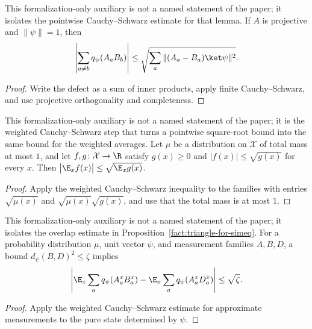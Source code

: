 \begin{lemma}
	\label{lem:distance-projective-left-square-root}
	\leanok
	This formalization-only auxiliary is not a named statement of the paper; it
	isolates the pointwise Cauchy--Schwarz estimate for that lemma. If $A$ is
	projective and $\|\psi\|=1$, then
	\[
		\left|\sum_{a\ne b}q_\psi(A_aB_b)\right|
		\leq\sqrt{\sum_a\|(A_a-B_a)\ket\psi\|^2}.
	\]
\end{lemma}
\begin{proof}
	\leanok
	Write the defect as a sum of inner products, apply finite
	Cauchy--Schwarz, and use projective orthogonality and completeness.
\end{proof}

\begin{lemma}
	\label{lem:distance-averaged-square-root}
	\leanok
	This formalization-only auxiliary is not a named statement of the paper; it
	is the weighted Cauchy--Schwarz step that turns a pointwise square-root
	bound into the same bound for the weighted averages. Let $\mu$ be a
	distribution on $\mathcal X$ of total mass at most $1$, and let
	$f,g\colon\mathcal X\to\R$ satisfy $g(x)\geq0$ and
	$|f(x)|\leq\sqrt{g(x)}$ for every $x$. Then
	$\bigl|\E_x f(x)\bigr|\leq\sqrt{\E_x g(x)}$.
\end{lemma}
\begin{proof}
	\leanok
	Apply the weighted Cauchy--Schwarz inequality to the families with entries
	$\sqrt{\mu(x)}$ and $\sqrt{\mu(x)}\sqrt{g(x)}$, and use that the total mass
	is at most $1$.
\end{proof}

\begin{lemma}
	\label{lem:distance-overlap-gap}
	\leanok
	This formalization-only auxiliary is not a named statement of the paper; it
	isolates the overlap estimate in Proposition~\ref{fact:triangle-for-simeq}.
	For a probability distribution $\mu$, unit vector $\psi$, and measurement
	families $A,B,D$, a bound $d_\psi(B,D)^2\leq\zeta$ implies
	\[
		\left|\E_x\sum_a q_\psi(A^x_aB^x_a)
		-\E_x\sum_a q_\psi(A^x_aD^x_a)\right|\leq\sqrt\zeta.
	\]
\end{lemma}
\begin{proof}
	\leanok
	Apply the weighted Cauchy--Schwarz estimate for approximate measurements
	to the pure state determined by $\psi$.
\end{proof}

